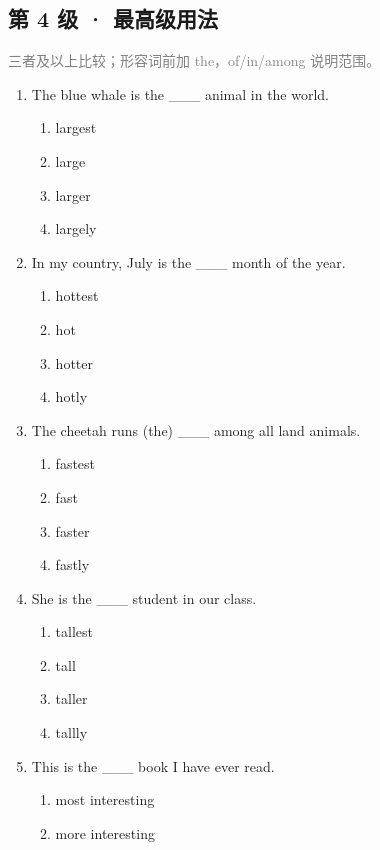 \documentclass[11pt,a4paper]{ctexart}
\begin{document}
\subsection*{第 4 级 · 最高级用法}
\noindent\textcolor{gray}{三者及以上比较；形容词前加 the，of/in/among 说明范围。}\par\smallskip
\begin{enumerate}[leftmargin=*,itemsep=4pt]
\item The blue whale is the \_\_\_ animal in the world.
\begin{enumerate}[label=\Alph*.,leftmargin=2em,itemsep=1pt,topsep=2pt]
\item largest
\item large
\item larger
\item largely
\end{enumerate}
\item In my country, July is the \_\_\_ month of the year.
\begin{enumerate}[label=\Alph*.,leftmargin=2em,itemsep=1pt,topsep=2pt]
\item hottest
\item hot
\item hotter
\item hotly
\end{enumerate}
\item The cheetah runs (the) \_\_\_ among all land animals.
\begin{enumerate}[label=\Alph*.,leftmargin=2em,itemsep=1pt,topsep=2pt]
\item fastest
\item fast
\item faster
\item fastly
\end{enumerate}
\item She is the \_\_\_ student in our class.
\begin{enumerate}[label=\Alph*.,leftmargin=2em,itemsep=1pt,topsep=2pt]
\item tallest
\item tall
\item taller
\item tallly
\end{enumerate}
\item This is the \_\_\_ book I have ever read.
\begin{enumerate}[label=\Alph*.,leftmargin=2em,itemsep=1pt,topsep=2pt]
\item most interesting
\item more interesting

\end{enumerate}
\end{enumerate}
\end{document}
